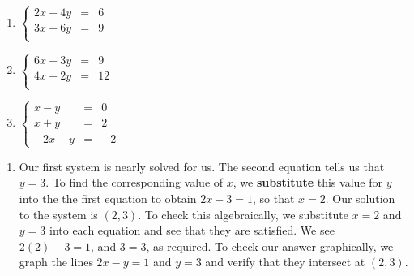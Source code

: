 \documentclass{ximera}
\begin{document}
\begin{example}
\begin{enumerate}
\item  $\left\{ \begin{array}{rcr} 2x - 4y & = & 6 \\ 3x -6y & = & 9\\ \end{array} \right.$ 

\item  $\left\{ \begin{array}{rcr} 6x + 3y & = & 9 \\ 4x + 2y & = & 12 \\ \end{array} \right.$ 

\item  $\left\{ \begin{array}{rcr} x - y & = & 0 \\ x + y & = & 2 \\ -2x + y & = & -2 \end{array} \right.$

\end{enumerate}


\begin{explanation}

\begin{enumerate}

\item  Our first system is nearly solved for us.  The second equation tells us that $y=3$.  To find the corresponding value of $x$, we \textbf{substitute} this value for $y$ into the the first equation to obtain $2x -  3 = 1$, so that $x = 2$.  Our solution to the system is $(2,3)$.  To check this algebraically, we substitute $x=2$ and $y=3$ into each equation and see that they are satisfied.  We see $2(2) - 3 = 1$, and $3=3$, as required.  To check our answer graphically, we graph the lines $2x-y = 1$ and $y=3$ and verify that they intersect at $(2,3)$.

\begin{center}
\end{center}


\end{enumerate}
\end{explanation}
\end{example}
\end{document}
